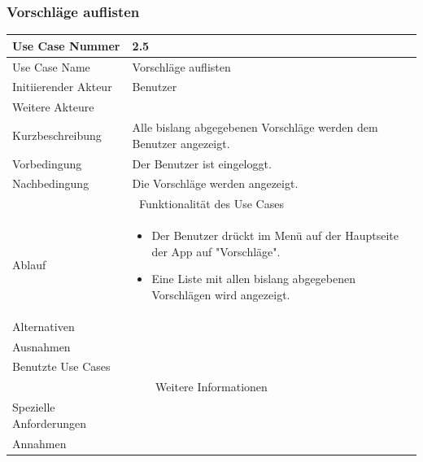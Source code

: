 \documentclass[10pt,a4paper]{article}
\begin{document}
\subsubsection{Vorschl\"age auflisten}
	\begin{tabularx}{\textwidth}{|l|X|}
	\hline Use Case Nummer & 2.5 \\ 
	\hline Use Case Name & Vorschl\"age auflisten \\ 
	\hline Initiierender Akteur & Benutzer \\
	\hline Weitere Akteure &  \\
	\hline Kurzbeschreibung & Alle bislang abgegebenen Vorschl\"age werden dem Benutzer angezeigt. \\
	\hline Vorbedingung & Der Benutzer ist eingeloggt. \\
	\hline Nachbedingung & Die Vorschl\"age werden angezeigt. \\
	\hline \multicolumn{2}{|c|}{Funktionalität des Use Cases}\\
	\hline Ablauf & \begin{itemize}
		\item Der Benutzer drückt im Men\"u auf der Hauptseite der App auf "Vorschl\"age".
		\item Eine Liste mit allen bislang abgegebenen Vorschlägen wird angezeigt.
	\end{itemize} \\
	\hline Alternativen &  \\
	\hline Ausnahmen &  \\
	\hline Benutzte Use Cases &  \\
	\hline \multicolumn{2}{|c|}{Weitere Informationen} \\
	\hline Spezielle Anforderungen &  \\
	\hline Annahmen &  \\
	\hline
	\end{tabularx}
\end{document}
